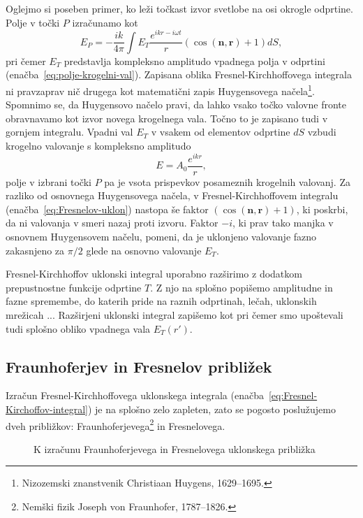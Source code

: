 Oglejmo si poseben primer, ko leži točkast izvor svetlobe na osi okrogle odprtine. Polje 
v točki $P$ izračunamo kot 
\begin{equation}
\label{eq:Fresnelov-uklon}
E_P =  -\frac{ik}{4\pi} \int E_T\frac{ e^{ikr-i\omega t}}{r}\left(\cos(\mathbf{n},\mathbf{r})+1\right) dS,
\end{equation}
pri čemer $E_T$ predstavlja kompleksno amplitudo vpadnega polja v odprtini (enačba~\ref{eq:polje-krogelni-val}). 
Zapisana oblika Fresnel-Kirchhoffovega integrala ni pravzaprav nič drugega kot 
matematični zapis Huygensovega 
načela\footnote{Nizozemski znanstvenik Christiaan Huygens, 1629--1695.}. 
Spomnimo se, da Huygensovo načelo pravi, da lahko vsako točko valovne fronte obravnavamo 
kot izvor novega krogelnega vala. Točno to je zapisano tudi v gornjem integralu. Vpadni val
$E_T$ v vsakem od elementov odprtine $dS$ vzbudi krogelno valovanje s
kompleksno amplitudo
\begin{equation}
E = A_0 \frac{e^{ikr}}{r},
\end{equation} 
polje v izbrani točki $P$ pa je vsota prispevkov posameznih krogelnih valovanj.
Za razliko od osnovnega Huygensovega načela, v Fresnel-Kirchhoffovem integralu 
(enačba~\ref{eq:Fresnelov-uklon})
nastopa še faktor $\left(\cos(\mathbf{n},\mathbf{r})+1\right)$, ki poskrbi, da ni valovanja 
v smeri nazaj proti izvoru. Faktor $-i$, ki prav tako manjka v osnovnem Huygensovem načelu,
pomeni, da je uklonjeno valovanje fazno zakasnjeno za $\pi/2$ glede na osnovno
valovanje $E_T$.

Fresnel-Kirchhoffov uklonski integral uporabno razširimo z dodatkom prepustnostne funkcije odprtine $T$.
Z njo na splošno popišemo amplitudne in fazne spremembe, do katerih pride na raznih 
odprtinah, lečah, uklonskih mrežicah ... Razširjeni uklonski integral zapišemo kot
pri čemer smo upoštevali tudi splošno obliko vpadnega vala $E_T(r')$.

\subsection*{Fraunhoferjev in Fresnelov približek}
\label{FFuklon}
Izračun Fresnel-Kirchhoffovega uklonskega integrala (enačba~\ref{eq:Fresnel-Kirchoffov-integral}) 
je na splošno zelo zapleten, zato se 
pogosto poslužujemo dveh približkov: Fraunhoferjevega\footnote{Nemški fizik 
Joseph von Fraunhofer, 1787--1826.} in Fresnelovega. 
\begin{figure}[!h]
\centering {} 
  
\caption{K izračunu Fraunhoferjevega in Fresnelovega uklonskega približka}
\label{fig:Uklon-koordinate}
\end{figure}

